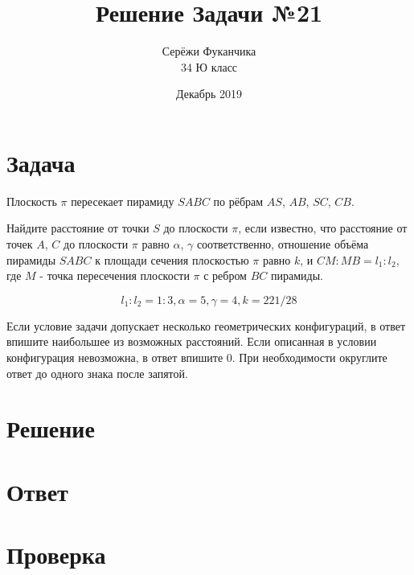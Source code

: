 \documentclass{article}
\title{Решение Задачи №21}
\author{Серёжи Фуканчика\\34 Ю класс}
\date{Декабрь 2019}
\begin{document}
\maketitle

\section{Задача}
Плоскость $\pi$ пересекает пирамиду $SABC$ по рёбрам $AS$, $AB$, $SC$, $CB$.

Найдите расстояние от точки $S$ до плоскости $\pi$, если известно, что расстояние от точек $A$, $C$ до плоскости $\pi$ равно $\alpha$, $\gamma$ соответственно, отношение объёма пирамиды $SABC$ к площади сечения плоскостью $\pi$ равно $k$, и $CM:MB=l_1:l_2$, где $M$ - точка пересечения плоскости $\pi$ с ребром $BC$ пирамиды.

$$l_1:l_2=1:3, \alpha=5, \gamma=4, k=221/28$$

Если условие задачи допускает несколько геометрических конфигураций, в ответ впишите наибольшее из возможных расстояний. Если описанная в условии конфигурация невозможна, в ответ впишите $0$. При необходимости округлите ответ до одного знака после запятой.

\section{Решение}

\section{Ответ}

\section{Проверка}
\end{document}
